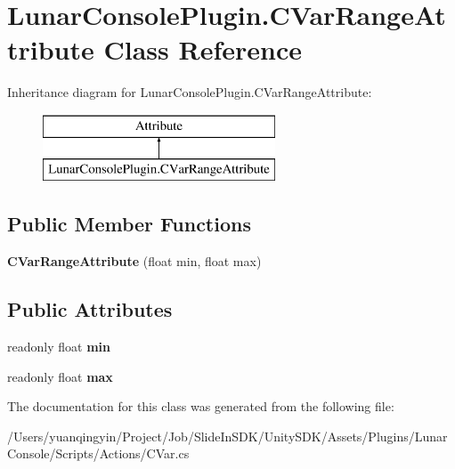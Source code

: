 \hypertarget{class_lunar_console_plugin_1_1_c_var_range_attribute}{}\section{Lunar\+Console\+Plugin.\+C\+Var\+Range\+Attribute Class Reference}
\label{class_lunar_console_plugin_1_1_c_var_range_attribute}
Inheritance diagram for Lunar\+Console\+Plugin.\+C\+Var\+Range\+Attribute\+:\begin{figure}[H]
\begin{center}
\leavevmode
\includegraphics[height=2.000000cm]{class_lunar_console_plugin_1_1_c_var_range_attribute}
\end{center}
\end{figure}
\subsection*{Public Member Functions}
\begin{DoxyCompactItemize}
\item 
\mbox{\label{class_lunar_console_plugin_1_1_c_var_range_attribute_a38983725031e1c8edfb075311fe83dc4}} 
{\bfseries C\+Var\+Range\+Attribute} (float min, float max)
\end{DoxyCompactItemize}
\subsection*{Public Attributes}
\begin{DoxyCompactItemize}
\item 
\mbox{\label{class_lunar_console_plugin_1_1_c_var_range_attribute_a37dd5e0dc9bfaacb522400d0206aa49d}} 
readonly float {\bfseries min}
\item 
\mbox{\label{class_lunar_console_plugin_1_1_c_var_range_attribute_a72265eae7ae450396f83733b7e3a7fc0}} 
readonly float {\bfseries max}
\end{DoxyCompactItemize}


The documentation for this class was generated from the following file\+:\begin{DoxyCompactItemize}
\item 
/\+Users/yuanqingyin/\+Project/\+Job/\+Slide\+In\+S\+D\+K/\+Unity\+S\+D\+K/\+Assets/\+Plugins/\+Lunar\+Console/\+Scripts/\+Actions/C\+Var.\+cs\end{DoxyCompactItemize}
